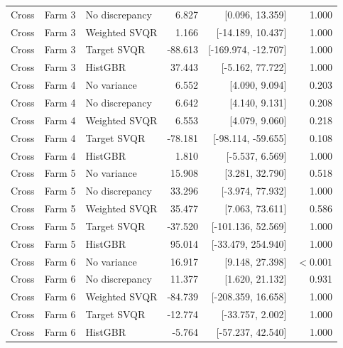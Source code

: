 {\begin{longtable}{lllrrr}
Cross & Farm 3 & No discrepancy & 6.827 & [0.096, 13.359] & 1.000 \\
Cross & Farm 3 & Weighted SVQR & 1.166 & [-14.189, 10.437] & 1.000 \\
Cross & Farm 3 & Target SVQR & -88.613 & [-169.974, -12.707] & 1.000 \\
Cross & Farm 3 & HistGBR & 37.443 & [-5.162, 77.722] & 1.000 \\
Cross & Farm 4 & No variance & 6.552 & [4.090, 9.094] & 0.203 \\
Cross & Farm 4 & No discrepancy & 6.642 & [4.140, 9.131] & 0.208 \\
Cross & Farm 4 & Weighted SVQR & 6.553 & [4.079, 9.060] & 0.218 \\
Cross & Farm 4 & Target SVQR & -78.181 & [-98.114, -59.655] & 0.108 \\
Cross & Farm 4 & HistGBR & 1.810 & [-5.537, 6.569] & 1.000 \\
Cross & Farm 5 & No variance & 15.908 & [3.281, 32.790] & 0.518 \\
Cross & Farm 5 & No discrepancy & 33.296 & [-3.974, 77.932] & 1.000 \\
Cross & Farm 5 & Weighted SVQR & 35.477 & [7.063, 73.611] & 0.586 \\
Cross & Farm 5 & Target SVQR & -37.520 & [-101.136, 52.569] & 1.000 \\
Cross & Farm 5 & HistGBR & 95.014 & [-33.479, 254.940] & 1.000 \\
Cross & Farm 6 & No variance & 16.917 & [9.148, 27.398] & $<0.001$ \\
Cross & Farm 6 & No discrepancy & 11.377 & [1.620, 21.132] & 0.931 \\
Cross & Farm 6 & Weighted SVQR & -84.739 & [-208.359, 16.658] & 1.000 \\
Cross & Farm 6 & Target SVQR & -12.774 & [-33.757, 2.002] & 1.000 \\
Cross & Farm 6 & HistGBR & -5.764 & [-57.237, 42.540] & 1.000 \\
\end{longtable}
}
